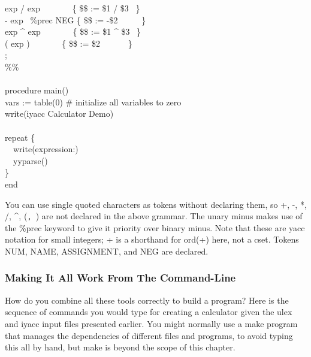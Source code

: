 {\>   {\textbar} exp {\textquotesingle}/{\textquotesingle} exp
\ \ \ \ \ \ \ \{ \$\$ := \$1 / \$3 \ \} \\
\>   {\textbar} {\textquotesingle}-{\textquotesingle} exp \ \%prec NEG
\{ \$\$ := -\$2 \ \ \ \ \ \} \\
\>   {\textbar} exp {\textquotesingle}\^{}{\textquotesingle} exp
\ \ \ \ \ \ \ \{ \$\$ := \$1 \^{} \$3 \ \} \\
\>   {\textbar} {\textquotesingle}({\textquotesingle} exp
{\textquotesingle}){\textquotesingle} \ \ \ \ \ \ \ \{ \$\$ := \$2
\ \ \ \ \ \ \} \\
\>   ; \\
\%\% \\
\ \\
procedure main() \\
\>   vars := table(0) \# initialize all variables to zero \\
\>   write({\textquotedbl}iyacc Calculator Demo{\textquotedbl}) \\
\ \\
\>   repeat \{ \\
\>   \ \ write({\textquotedbl}expression:{\textquotedbl})  \\
\>   \ \ yyparse() \\
\>   \} \\
end
}

You can use single quoted characters as tokens without declaring them,
so \textsf{{\textquotesingle}+{\textquotesingle}},
\textsf{{\textquotesingle}-{\textquotesingle}},
\textsf{{\textquotesingle}*{\textquotesingle}},
\textsf{{\textquotesingle}/{\textquotesingle}},
\textsf{{\textquotesingle}\^{}{\textquotesingle}},
\textsf{{\textquotesingle}({\textquotesingle}}\texttt{,
}\textsf{{\textquotesingle}){\textquotesingle}} are not declared in the
above grammar. The unary minus makes use of the \textsf{\%prec} keyword
to give it priority over binary minus. Note that these are
\textsf{yacc} notation for small integers;
\textsf{{\textquotesingle}+{\textquotesingle}} is a shorthand for
\textsf{ord({\textquotedbl}+{\textquotedbl})} here, not a cset. Tokens
NUM, NAME, ASSIGNMENT, and NEG are declared.

\subsubsection{Making It All Work From The Command-Line}
How do you combine all these tools correctly to build a program? Here is
the sequence of commands you would type for creating a calculator given
the ulex and iyacc input files presented earlier. You might normally
use a {\textquotedbl}make{\textquotedbl} program that manages the
dependencies of different files and programs, to avoid typing this all
by hand, but {\textquotedbl}make{\textquotedbl} is beyond the scope of
this chapter.


